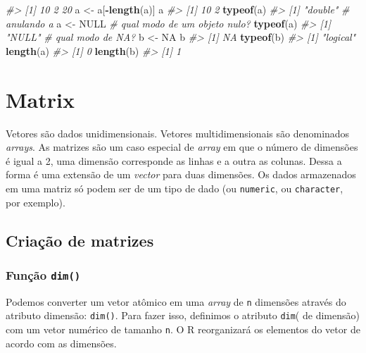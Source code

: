 \documentclass[]{book}
\newenvironment{Shaded}{\begin{snugshade}}{\end{snugshade}}
\newcommand{\KeywordTok}[1]{\textcolor[rgb]{0.13,0.29,0.53}{\textbf{#1}}}
\newcommand{\StringTok}[1]{\textcolor[rgb]{0.31,0.60,0.02}{#1}}
\newcommand{\CommentTok}[1]{\textcolor[rgb]{0.56,0.35,0.01}{\textit{#1}}}
\newcommand{\OtherTok}[1]{\textcolor[rgb]{0.56,0.35,0.01}{#1}}
\newcommand{\OperatorTok}[1]{\textcolor[rgb]{0.81,0.36,0.00}{\textbf{#1}}}
\newcommand{\NormalTok}[1]{#1}
\begin{document}
\begin{Shaded}
\begin{Highlighting}[]
\CommentTok{#> [1] 10  2 20}
\NormalTok{a <-}\StringTok{ }\NormalTok{a[}\OperatorTok{-}\KeywordTok{length}\NormalTok{(a)]}
\NormalTok{a}
\CommentTok{#> [1] 10  2}
\KeywordTok{typeof}\NormalTok{(a)}
\CommentTok{#> [1] "double"}
\CommentTok{# anulando a}
\NormalTok{a <-}\StringTok{ }\OtherTok{NULL}
\CommentTok{# qual modo de um objeto nulo?}
\KeywordTok{typeof}\NormalTok{(a)}
\CommentTok{#> [1] "NULL"}
\CommentTok{# qual modo de NA?}
\NormalTok{b <-}\StringTok{ }\OtherTok{NA}
\NormalTok{b}
\CommentTok{#> [1] NA}
\KeywordTok{typeof}\NormalTok{(b)}
\CommentTok{#> [1] "logical"}
\KeywordTok{length}\NormalTok{(a)}
\CommentTok{#> [1] 0}
\KeywordTok{length}\NormalTok{(b)}
\CommentTok{#> [1] 1}
\end{Highlighting}
\end{Shaded}

\section{Matrix}\label{matrix}

Vetores são dados unidimensionais. Vetores multidimensionais são
denominados \emph{arrays}. As matrizes são um caso especial de
\emph{array} em que o número de dimensões é igual a 2, uma dimensão
corresponde as linhas e a outra as colunas. Dessa a forma é uma extensão
de um \emph{vector} para duas dimensões. Os dados armazenados em uma
matriz só podem ser de um tipo de dado (ou \texttt{numeric}, ou
\texttt{character}, por exemplo).

\subsection{Criação de matrizes}\label{criacao-de-matrizes}

\subsubsection{\texorpdfstring{Função
\texttt{dim()}}{Função dim()}}\label{funcao-dim}

Podemos converter um vetor atômico em uma \emph{array} de \texttt{n}
dimensões através do atributo dimensão: \texttt{dim()}. Para fazer isso,
definimos o atributo \texttt{dim}( de dimensão) com um vetor numérico de
tamanho \texttt{n}. O R reorganizará os elementos do vetor de acordo com
as dimensões.
\end{document}
